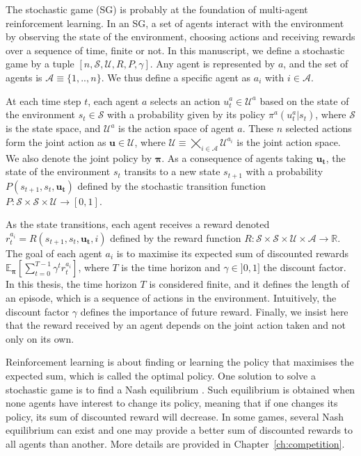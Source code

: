 
The stochastic game (SG) \citep{stochasticGames} is probably at the foundation of multi-agent reinforcement learning.
In an SG, a set of agents interact with the environment by observing the state of the environment, choosing actions and receiving rewards over a sequence of time, finite or not.
In this manuscript, we define a stochastic game by a tuple $[n, \mathcal{S}, \mathcal{U}, R, P, \gamma]$.
Any agent is represented by $a$, and the set of agents is $\mathcal{A} \equiv \{1,..,n\}$.
We thus define a specific agent as $a_i$ with $i \in \mathcal{A}$.

At each time step $t$, each agent $a$ selects an action $u_t^a \in \mathcal{U}^a$ based on the state of the environment $s_t \in \mathcal{S}$ with a probability given by its policy $\pi^a(u^a_t|s_t)$, where $\mathcal{S}$ is the state space, and $\mathcal{U}^a$ is the action space of agent $a$.
These $n$ selected actions form the joint action as $\mathbf{u} \in \mathcal{U}$, where $\mathcal{U} \equiv \bigtimes_{i \in \mathcal{A}} \mathcal{U}^{a_i}$ is the joint action space.
We also denote the joint policy by $\mathbf{\pi}$.
As a consequence of agents taking $\mathbf{u_t}$, the state of the environment $s_t$ transits to a new state $s_{t+1}$ with a probability $P(s_{t+1}, s_t, \mathbf{u_t})$ defined by the stochastic transition function $P:\mathcal{S} \times \mathcal{S} \times \mathcal{U} \rightarrow [0,1]$.

As the state transitions, each agent receives a reward denoted $r_t^{a_i} = R(s_{t+1}, s_t, \mathbf{u_t}, i)$ defined by the reward function $R: \mathcal{S} \times \mathcal{S} \times \mathcal{U} \times \mathcal{A} \rightarrow \mathbb{R}$.
The goal of each agent $a_i$ is to maximise its expected sum of discounted rewards $\mathbb{E}_{\mathbf{\pi}}\left[ \sum_{t=0}^{T-1} \gamma^t r^{a_i}_t \right]$, where $T$ is the time horizon and $\gamma \in ]0, 1]$ the discount factor.
In this thesis, the time horizon $T$ is considered finite, and it defines the length of an episode, which is a sequence of actions in the environment.
Intuitively, the discount factor $\gamma$ defines the importance of future reward.
Finally, we insist here that the reward received by an agent depends on the joint action taken and not only on its own.

Reinforcement learning is about finding or learning the policy that maximises the expected sum, which is called the optimal policy.
One solution to solve a stochastic game is to find a Nash equilibrium \citep{nash1950equilibrium}.
Such equilibrium is obtained when none agents have interest to change its policy, meaning that if one changes its policy, its sum of discounted reward will decrease.
In some games, several Nash equilibrium can exist and one may provide a better sum of discounted rewards to all agents than another.
More details are provided in Chapter~\ref{ch:competition}.

